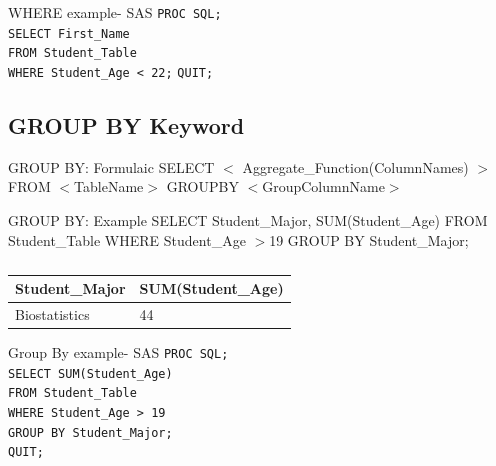 \documentclass{beamer}
\begin{document}
	\begin{frame}{WHERE example- SAS}
		\texttt{PROC SQL;} \\
		\texttt{SELECT First\_Name } \\
		\texttt{FROM Student\_Table}\\
		\texttt{WHERE Student\_Age < 22;} 
		\texttt{QUIT;}
	\end{frame}
		\subsection{GROUP BY Keyword}
		\begin{frame}
		\begin{block}{GROUP BY: Formulaic}
			SELECT $<$ Aggregate\_Function(ColumnNames) $>$ FROM $<$TableName$>$ GROUPBY $<$GroupColumnName$>$
		\end{block}
		\begin{block}{GROUP BY: Example}
			SELECT Student\_Major, SUM(Student\_Age) FROM Student\_Table WHERE Student\_Age $>$19 GROUP BY Student\_Major;
		\end{block}
		\begin{table}[H]
			\centering
			\caption*{}

			\begin{tabular}{|l|l|}
				\hline
				Student\_Major & SUM(Student\_Age)  \\ \hline
				Biostatistics  & 44 \\ \hline
			\end{tabular}
		\end{table}			
		\end{frame}
		
	\begin{frame}{Group By example- SAS}
		\texttt{PROC SQL;} \\
		\texttt{SELECT SUM(Student\_Age) } \\
		\texttt{FROM Student\_Table}\\
		\texttt{WHERE Student\_Age > 19  } \\
		\texttt{GROUP BY Student\_Major;} \\
		\texttt{QUIT;}
	\end{frame}
\end{document}
